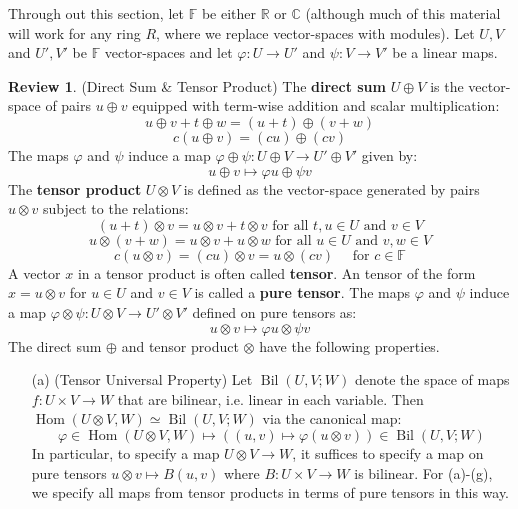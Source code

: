 \documentclass[12pt]{article}
\theoremstyle{definition}
\newtheorem{review}[theorem]{Review}
\numberwithin{equation}{section}
\newcommand{\C}{{\mathbb C}}
\newcommand{\R}{{\mathbb R}}
\newcommand{\op}{\operatorname}
\begin{document}
Through out this section, let $\mathbb{F}$ be either $\R$ or $\C$ (although much of this material will work for any ring $R$, where we replace vector-spaces with modules). Let $U,V$ and $U',V'$ be $\mathbb{F}$ vector-spaces and let $\varphi:U \to U'$ and $\psi:V \to V'$ be a linear maps. 

\begin{review} \label{rev:direct_sum_and_tensor_product} (Direct Sum \& Tensor Product) The {\bf direct sum} $U \oplus V$ is the vector-space of pairs $u \oplus v$ equipped with term-wise addition and scalar multiplication:
\[u \oplus v + t \oplus w = (u + t) \oplus (v + w)\]
\[c(u \oplus v) = (cu) \oplus (cv)\]
The maps $\varphi$ and $\psi$ induce a map $\varphi \oplus \psi:U \oplus V \to U' \oplus V'$ given by:
\[
u \oplus v \mapsto \varphi u \oplus \psi v
\]
The {\bf tensor product} $U \otimes V$ is defined as the vector-space generated by pairs $u \otimes v$ subject to the relations:
	\[(u + t) \otimes v = u \otimes v + t \otimes v \text{ for all $t,u \in U$ and $v \in V$}\]
	\[u\otimes (v + w) = u \otimes v + u \otimes w \text{ for all $u \in U$ and $v,w \in V$}\]
	\[ c(u \otimes v) = (cu) \otimes v = u \otimes (cv) \quad \text{ for }c \in \mathbb{F}\]
A vector $x$ in a tensor product is often called {\bf tensor}. An tensor of the form $x = u \otimes v$ for $u \in U$ and $v \in V$ is called a {\bf pure tensor}.  The maps $\varphi$ and $\psi$ induce a map $\varphi \otimes \psi:U \otimes V \to U' \otimes V'$ defined on pure tensors as:
\[u \otimes v \mapsto \varphi u \otimes \psi v\]
The direct sum $\oplus$ and tensor product $\otimes$ have the following properties.
\begin{itemize}
	\item[(a)] (Tensor Universal Property) Let $\op{Bil}(U,V;W)$ denote the space of maps $f:U \times V \to W$ that are bilinear, i.e. linear in each variable. Then $\op{Hom}(U \otimes V,W) \simeq \op{Bil}(U,V;W)$ via the canonical map:
	\[
	\varphi \in \op{Hom}(U \otimes V,W) \mapsto ((u,v) \mapsto \varphi(u \otimes v)) \in \op{Bil}(U,V;W)
	\]
	In particular, to specify a map $U \otimes V \to W$, it suffices to specify a map on pure tensors $u \otimes v \mapsto B(u,v)$ where $B:U \times V \to W$ is bilinear. For (a)-(g), we specify all maps from tensor products in terms of pure tensors in this way.


\end{itemize}
\end{review}
\end{document}
